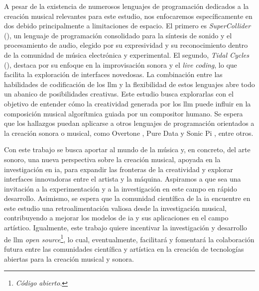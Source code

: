 A pesar de la existencia de numerosos lenguajes de programación dedicados a la creación musical relevantes para este estudio, nos enfocaremos específicamente en dos debido principalmente a limitaciones de espacio. El primero es \emph{SuperCollider} (\citeyear{SuperCollider2024}), un lenguaje de programación consolidado para la síntesis de sonido y el procesamiento de audio, elegido por su expresividad y su reconocimiento dentro de la comunidad de música electrónica y experimental. El segundo, \emph{Tidal Cycles} (\citeyear{TidalCycles}), destaca por su enfoque en la improvisación sonora y el \emph{live coding}, lo que facilita la exploración de interfaces novedosas. La combinación entre las habilidades de codificación de los \gls{llm} y la flexibilidad de estos lenguajes abre todo un abanico de posibilidades creativas. Este estudio busca explorarlas con el objetivo de entender cómo la creatividad generada por los \gls{llm} puede influir en la composición musical algorítmica guiada por un compositor humano. Se espera que los hallazgos puedan aplicarse a otros lenguajes de programación orientados a la creación sonora o musical, como {Overtone} \citep{OvertoneCollaborativeProgrammable}, {Pure Data} \citep{PureDataPd} y {Sonic Pi} \citep{SonicPiLive}, entre otros.

Con este trabajo se busca aportar al mundo de la música y, en concreto, del arte sonoro, una nueva perspectiva sobre la creación musical, apoyada en la investigación en \gls{ia}, para expandir las fronteras de la creatividad y explorar interfaces innovadoras entre el artista y la máquina. Aspiramos a que sea una invitación a la experimentación y a la investigación en este campo en rápido desarrollo. 
Asimismo, se espera que la comunidad científica de la \gls{ia} encuentre en este estudio una retroalimentación valiosa desde la investigación musical, contribuyendo a mejorar los modelos de \gls{ia} y sus aplicaciones en el campo artístico. Igualmente, este trabajo quiere incentivar la investigación y desarrollo de \gls{llm} \emph{open source}\footnote{\emph{Código abierto}.}, lo cual, eventualmente, facilitará y fomentará la colaboración futura entre las comunidades científica y artística en la creación de tecnologías abiertas para la creación musical y sonora.